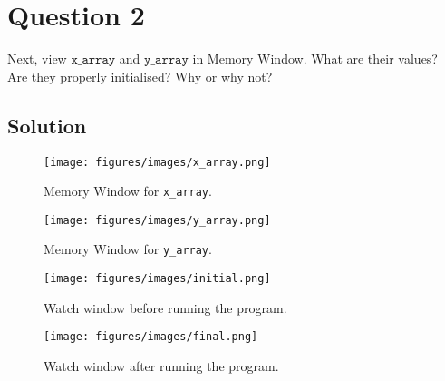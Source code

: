 \section*{Question 2}

Next, view \(\texttt{x\_array}\) and \(\texttt{y\_array}\) in Memory Window.
What are their values?\\
Are they properly initialised?
Why or why not?

\subsection*{Solution}

\begin{figure*}[htbp]
    \centering
    \texttt{[image: figures/images/x\_array.png]}
    \caption{
        Memory Window for \texttt{x\_array}.
    }\label{fig:x_array}
\end{figure*}

\begin{figure*}[htbp]
    \centering
    \texttt{[image: figures/images/y\_array.png]}
    \caption{
        Memory Window for \texttt{y\_array}.
    }\label{fig:y_array}
\end{figure*}

\begin{figure*}[htbp]
    \centering
    \texttt{[image: figures/images/initial.png]}
    \caption{
        Watch window before running the program.
    }\label{fig:initial}
\end{figure*}

\begin{figure*}[htbp]
    \centering
    \texttt{[image: figures/images/final.png]}
    \caption{
        Watch window after running the program.
    }\label{fig:final}
\end{figure*}
